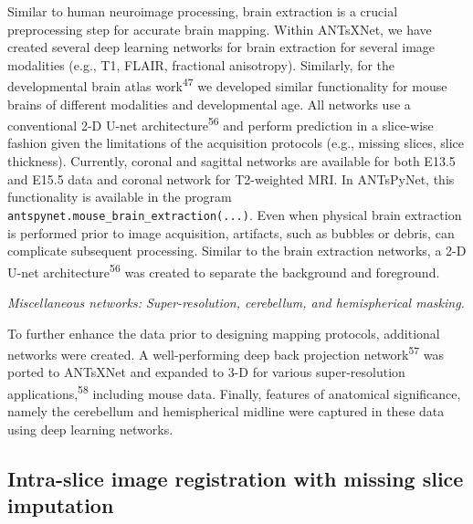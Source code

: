 \documentclass[
  12pt,
]{article}
\begin{document}
Similar to human neuroimage processing, brain extraction is a crucial
preprocessing step for accurate brain mapping. Within ANTsXNet, we have
created several deep learning networks for brain extraction for several
image modalities (e.g., T1, FLAIR, fractional anisotropy). Similarly,
for the developmental brain atlas work\textsuperscript{47} we developed
similar functionality for mouse brains of different modalities and
developmental age. All networks use a conventional 2-D U-net
architecture\textsuperscript{56} and perform prediction in a slice-wise
fashion given the limitations of the acquisition protocols (e.g.,
missing slices, slice thickness). Currently, coronal and sagittal
networks are available for both E13.5 and E15.5 data and coronal network
for T2-weighted MRI. In ANTsPyNet, this functionality is available in
the program \texttt{antspynet.mouse\_brain\_extraction(...)}. Even when
physical brain extraction is performed prior to image acquisition,
artifacts, such as bubbles or debris, can complicate subsequent
processing. Similar to the brain extraction networks, a 2-D U-net
architecture\textsuperscript{56} was created to separate the background
and foreground.

\emph{Miscellaneous networks: Super-resolution, cerebellum, and
hemispherical masking.}

To further enhance the data prior to designing mapping protocols,
additional networks were created. A well-performing deep back projection
network\textsuperscript{57} was ported to ANTsXNet and expanded to 3-D
for various super-resolution applications,\textsuperscript{58} including
mouse data. Finally, features of anatomical significance, namely the
cerebellum and hemispherical midline were captured in these data using
deep learning networks.

\hypertarget{intra-slice-image-registration-with-missing-slice-imputation}{%
\subsection*{Intra-slice image registration with missing slice
imputation}\label{intra-slice-image-registration-with-missing-slice-imputation}}
\end{document}
